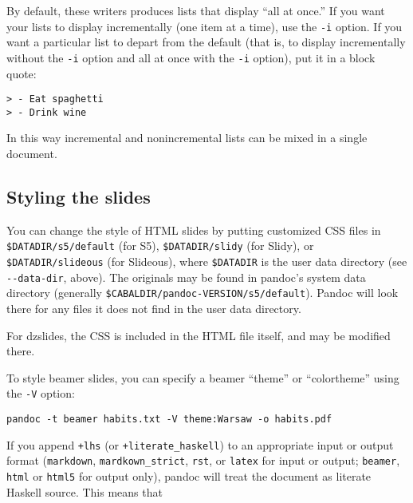 \documentclass[]{article}
\begin{document}
By default, these writers produces lists that display ``all at once.''
If you want your lists to display incrementally (one item at a time),
use the \texttt{-i} option. If you want a particular list to depart from
the default (that is, to display incrementally without the \texttt{-i}
option and all at once with the \texttt{-i} option), put it in a block
quote:

\begin{verbatim}
> - Eat spaghetti
> - Drink wine
\end{verbatim}

In this way incremental and nonincremental lists can be mixed in a
single document.

\subsection{Styling the slides}

You can change the style of HTML slides by putting customized CSS files
in \texttt{\$DATADIR/s5/default} (for S5), \texttt{\$DATADIR/slidy} (for
Slidy), or \texttt{\$DATADIR/slideous} (for Slideous), where
\texttt{\$DATADIR} is the user data directory (see
\texttt{-{}-data-dir}, above). The originals may be found in pandoc's
system data directory (generally
\texttt{\$CABALDIR/pandoc-VERSION/s5/default}). Pandoc will look there
for any files it does not find in the user data directory.

For dzslides, the CSS is included in the HTML file itself, and may be
modified there.

To style beamer slides, you can specify a beamer ``theme'' or
``colortheme'' using the \texttt{-V} option:

\begin{verbatim}
pandoc -t beamer habits.txt -V theme:Warsaw -o habits.pdf
\end{verbatim}


If you append \texttt{+lhs} (or \texttt{+literate\_haskell}) to an
appropriate input or output format (\texttt{markdown},
\texttt{mardkown\_strict}, \texttt{rst}, or \texttt{latex} for input or
output; \texttt{beamer}, \texttt{html} or \texttt{html5} for output
only), pandoc will treat the document as literate Haskell source. This
means that
\end{document}
